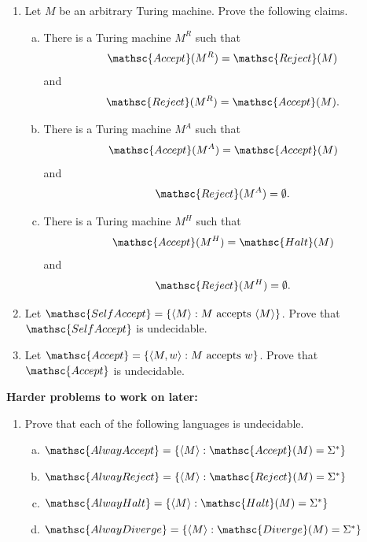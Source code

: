 \documentclass[11pt]{article}
\begin{document}


\begin{enumerate}
\item 
Let $M$ be an arbitrary Turing machine. Prove the following claims.
\begin{enumerate}[(a)]
    \item There is a Turing machine $M^R$ such that $$\mathsc{Accept}(M^R) =
    \mathsc{Reject}(M)$$ and $$\mathsc{Reject}(M^R)=\mathsc{Accept}(M).$$
    \item There is a Turing machine $M^A$ such that $$\mathsc{Accept}(M^A) =
    \mathsc{Accept}(M)$$ and $$\mathsc{Reject}(M^A)=\emptyset.$$
    \item There is a Turing machine $M^H$ such that $$\mathsc{Accept}(M^H) =
    \mathsc{Halt}(M)$$ and $$\mathsc{Reject}(M^H)=\emptyset.$$
\end{enumerate}

\item Let $\mathsc{SelfAccept} = \{\langle M \rangle: M \text{ accepts } \langle
M \rangle \}$. Prove that $\mathsc{SelfAccept}$ is undecidable.

\item Let $\mathsc{Accept} = \{\langle M, w \rangle: M \text{ accepts } w\}$. Prove that $\mathsc{Accept}$ is undecidable.


\end{enumerate}

\newpage
\noindent\textbf{Harder problems to work on later:}

\begin{enumerate}\itemsep 4ex
\setcounter{enumi}{5}
\item Prove that each of the following languages is undecidable.
\begin{enumerate}[(a)]
    \item $\mathsc{AlwayAccept} = \{\langle M \rangle: \mathsc{Accept}(M) = \Sigma^*\}$
    \item $\mathsc{AlwayReject} = \{\langle M \rangle: \mathsc{Reject}(M) = \Sigma^*\}$
    \item $\mathsc{AlwayHalt} = \{\langle M \rangle: \mathsc{Halt}(M) = \Sigma^*\}$
    \item $\mathsc{AlwayDiverge} = \{\langle M \rangle: \mathsc{Diverge}(M) = \Sigma^*\}$
\end{enumerate}


\end{enumerate}
\end{document}

